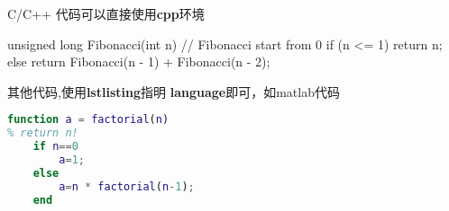 \documentclass[12pt,openright]{book}
\begin{document}
C/C++ 代码可以直接使用\textbf{cpp}环境

\begin{cpp}[caption={斐波那契C++}]
unsigned long Fibonacci(int n)
{
    // Fibonacci start from 0
    if (n <= 1) 
    {
        return n;
    }
    else 
    {
        return Fibonacci(n - 1) + Fibonacci(n - 2);
    }
}
\end{cpp}

其他代码,使用\textbf{lstlisting}指明 \textbf{language}即可，如matlab代码

\begin{lstlisting}[caption={Matlab代码},language=Matlab]
function a = factorial(n)
% return n!
    if n==0
        a=1;
    else
        a=n * factorial(n-1);
    end
\end{lstlisting}
\end{document}

